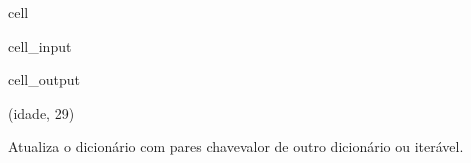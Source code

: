 \documentclass[letterpaper,10pt,english]{jupyterBook}
\begin{document}
\begin{sphinxuseclass}{cell}\begin{sphinxVerbatimInput}

\begin{sphinxuseclass}{cell_input}
\begin{sphinxVerbatim}[commandchars=\\\{\}]
     
  
\end{sphinxVerbatim}

\end{sphinxuseclass}\end{sphinxVerbatimInput}
\begin{sphinxVerbatimOutput}

\begin{sphinxuseclass}{cell_output}
\begin{sphinxVerbatim}[commandchars=\\\{\}]
(\PYGZsq{}idade\PYGZsq{}, 29)
\end{sphinxVerbatim}

\end{sphinxuseclass}\end{sphinxVerbatimOutput}

\end{sphinxuseclass}
\sphinxAtStartPar
{}
Atualiza o dicionário com pares chave\sphinxhyphen{}valor de outro dicionário ou iterável.
\end{document}
